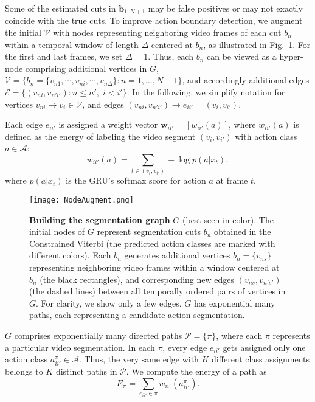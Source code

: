 \documentclass[10pt,twocolumn,letterpaper]{article}
\begin{document}
Some of the estimated cuts in $\bm{b}_{1:N+1}$ may be false positives or may not exactly coincide with the true cuts. To improve action boundary detection, we augment the initial $\mathcal{V}$ with nodes representing neighboring video frames of each cut $b_{n}$ within a temporal window of length $\Delta$ centered at $b_{n}$, as illustrated in Fig.~\ref{fig:NodeAugment}. For the first and last frames, we set $\Delta=1$. Thus, each $b_{n}$ can be viewed as a hyper-node comprising additional vertices in $G$, $\mathcal{V}=\{b_n=\{v_{n1},\cdots,v_{ni},\cdots,v_{n\Delta}\}:n=1,\dots,N+1\}$, and accordingly additional  edges $\mathcal{E}=\{(v_{ni},v_{n'i'}): n\le n', \; i<i'\}$.  In the following, we simplify notation for vertices $v_{ni}\to v_i \in \mathcal{V}$, and edges  $(v_{ni},v_{n'i'}) \to e_{ii'}=(v_i,v_{i'})$.

Each edge $e_{ii'}$ is assigned a weight vector  $\bm{w}_{ii'}=[w_{ii'}(a)]$, where  $w_{ii'}(a)$ is defined as the energy of labeling the video segment  $(v_i,v_{i'})$ with action class $a\in\mathcal{A}$:
\begin{equation}
w_{ii'}(a) = \sum_{t\in(v_i,v_{i'})} -\log p(a|x_t),
\label{eq:edgeweight}
\end{equation}
where $p(a|x_t)$ is the GRU's softmax score for action $a$ at frame $t$.



\begin{figure}
\centering
\texttt{[image: NodeAugment.png]}
\caption{{\bf Building the segmentation graph} $G$ (best seen in color). The initial nodes of $G$ represent segmentation cuts $b_{n}$ obtained in the Constrained Viterbi (the predicted action classes are marked with different colors). Each $b_{n}$ generates additional vertices $b_n=\{v_{ns}\}$ representing neighboring video frames within a window  centered at $b_n$ (the black rectangles), and corresponding new edges $(v_{ns},v_{n's'})$ (the dashed lines) between all temporally ordered pairs of vertices in $G$. For clarity, we show only a few edges. $G$ has exponential many  paths, each representing a candidate action segmentation.}
\label{fig:NodeAugment}
\end{figure}

$G$ comprises exponentially many directed paths $\mathcal{P}=\{\pi\}$, where each $\pi$ represents a particular video segmentation. In each $\pi$, every edge $e_{ii'}$ gets assigned only one action class $a_{ii'}^{\pi}\in\mathcal{A}$. Thus, the very same edge with $K$ different class assignments belongs to $K$ distinct paths in $\mathcal{P}$. We compute the energy of a path as\begin{equation}
    E_{\pi}= \sum_{e_{ii'}\in\pi}  w_{ii'}(a_{ii'}^{\pi}).
\label{eq:energy}
\end{equation}
\end{document}
